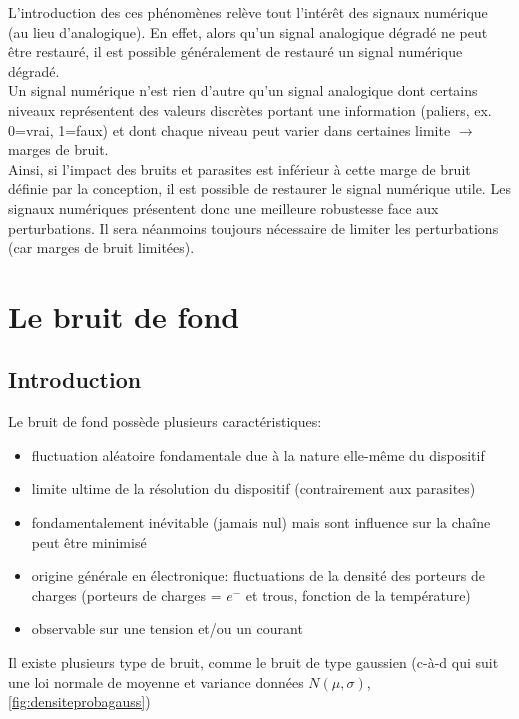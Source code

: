 L'introduction des ces phénomènes relève tout l'intérêt des signaux numérique (au lieu d'analogique). En effet, alors qu'un signal analogique dégradé ne peut être restauré, il est possible généralement de restauré un signal numérique dégradé.\\
Un signal numérique n'est rien d'autre qu'un signal analogique dont certains niveaux représentent des valeurs discrètes portant une information (paliers, ex. 0=vrai, 1=faux) et dont chaque niveau peut varier dans certaines limite $\rightarrow$ marges de bruit.\\

Ainsi, si l'impact des bruits et parasites est inférieur à cette marge de bruit définie par la conception, il est possible de restaurer le signal numérique utile. Les signaux numériques présentent donc une meilleure robustesse face aux perturbations. Il sera néanmoins toujours nécessaire de limiter les perturbations (car marges de bruit limitées).
\section{Le bruit de fond}
\subsection{Introduction}
Le bruit de fond possède plusieurs caractéristiques:
\begin{itemize}
	\item fluctuation aléatoire fondamentale due à la nature elle-même du dispositif
	\item limite ultime de la résolution du dispositif (contrairement aux parasites)
	\item fondamentalement inévitable (jamais nul) mais sont influence sur la chaîne peut être minimisé
	\item origine générale en électronique: fluctuations de la densité des porteurs de charges (porteurs de charges = $e^-$ et trous, fonction de la température)
	\item observable sur une tension et/ou un courant
\end{itemize}
Il existe plusieurs type de bruit, comme le bruit de type gaussien (c-à-d qui suit une loi normale de moyenne et variance données $N(\mu,\sigma)$, \autoref{fig:densiteprobagauss})

